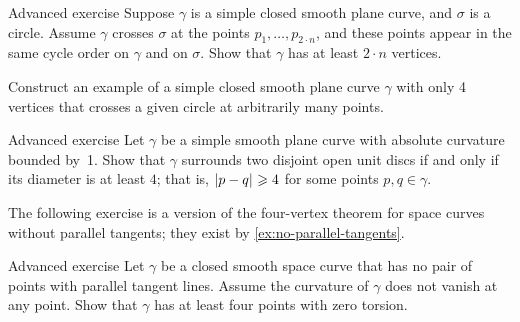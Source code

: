 \begin{thm}{Advanced exercise}\label{ex:curve-crosses-circle}
Suppose $\gamma$ is a simple closed smooth plane curve, and $\sigma$ is a circle.
Assume $\gamma$ crosses $\sigma$ at the points $p_1,\dots,p_{2{\cdot} n}$, and these points appear in the same cycle order on $\gamma$ and on $\sigma$.
Show that $\gamma$ has at least $2\cdot n$ vertices.

Construct an example of a simple closed smooth plane curve $\gamma$ with only 4 vertices that crosses a given circle at arbitrarily many points. 
\end{thm}

\begin{thm}{Advanced exercise}\label{ex:berk}
Let $\gamma$ be a simple smooth plane curve with absolute curvature bounded by~1.
Show that $\gamma$ surrounds two disjoint open unit discs if and only if its diameter is at least $4$;
that is, $\dist{p}{q}{}\ge 4$ for some points $p,q\in\gamma$. 
\end{thm}


The following exercise is a version of the four-vertex theorem for space curves without parallel tangents; they exist by \ref{ex:no-parallel-tangents}.

\begin{thm}{Advanced exercise}\label{ex:4x0-torsion}
Let $\gamma$ be a closed smooth space curve that has no pair of points with parallel tangent lines.
Assume the curvature of $\gamma$ does not vanish at any point.
Show that $\gamma$ has at least four points with zero torsion.
\end{thm}
